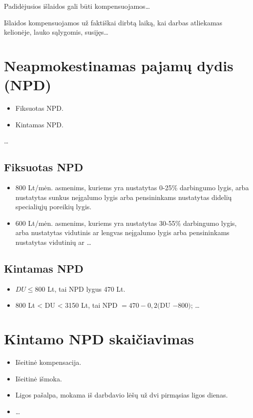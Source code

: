 Padidėjusios išlaidos gali būti kompensuojamos…

Išlaidos kompensuojamos už faktiškai dirbtą laiką, kai darbas atliekamas
kelionėje, lauko sąlygomis, susijęs…

\section{Neapmokestinamas pajamų dydis (NPD)}

\begin{itemize}
  \item Fiksuotas NPD.
  \item Kintamas NPD.
\end{itemize}

…

\subsection{Fiksuotas NPD}

\begin{itemize}
  \item 800 Lt/mėn. asmenims, kuriems yra nustatytas 0-25\% darbingumo
    lygis, arba nustatytas sunkus neįgalumo lygis arba pensininkams
    nustatytas didelių specialiųjų poreikių lygis.
  \item 600 Lt/mėn. asmenims, kuriems yra nustatytas 30-55\% darbingumo
    lygis, arba nustatytas vidutinis ar lengvas neįgalumo lygis
    arba pensininkams nustatytas vidutinių ar …
\end{itemize}

\subsection{Kintamas NPD}

\begin{itemize}
  \item $DU \leq 800$ Lt, tai NPD lygus 470 Lt.
  \item 800 Lt < DU < 3150 Lt, tai
    NPD $= 470 - 0,2 ($DU $- 800)$;
    …
\end{itemize}

\section{Kintamo NPD skaičiavimas}

\begin{itemize}
  \item Išeitinė kompensacija.
  \item Išeitinė išmoka.
  \item Ligos pašalpa, mokama iš darbdavio lėšų už dvi pirmąsias ligos
    dienas.
  \item …
\end{itemize}

